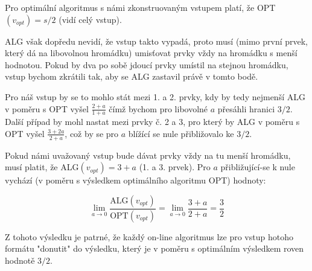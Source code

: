 \documentclass[a4paper, 12pt]{article}
\begin{document}
  Pro optimální algoritmus s námi zkonstruovaným vstupem platí, že OPT$(v_{opt})=s/2$ (vidí celý vstup).

  ALG však dopředu nevidí, že vstup takto vypadá, proto musí (mimo první prvek, který dá na libovolnou hromádku) umisťovat prvky vždy na hromádku s menší hodnotou. Pokud by dva po sobě jdoucí prvky umístil na stejnou hromádku, vstup bychom zkrátili tak, aby se ALG zastavil právě v tomto bodě.

  Pro náš vstup by se to mohlo stát mezi 1. a 2. prvky, kdy by tedy nejmenší ALG v poměru s OPT vyšel $\frac{2+a}{1+a}$ čímž bychom pro libovolné $a$ přesáhli hranici $3/2$. Další případ by mohl nastat mezi prvky č. 2 a 3, pro který by ALG v poměru s OPT vyšel $\frac{3+2a}{2+a}$, což by se pro $a$ blížící se nule přibližovalo ke $3/2$.

  Pokud námi uvažovaný vstup bude dávat prvky vždy na tu menší hromádku, musí platit, že ALG$(v_{opt})=3+a$ (1. a 3. prvek). Pro $a$ přibližující-se k nule vychází (v poměru s výsledkem optimálního algoritmu OPT) hodnoty:

  $$\lim_{a\to0} \frac{\text{ALG}(v_{opt})}{\text{OPT}(v_{opt})}
  =\lim_{a\to0} \frac{3+a}{2+a}
  =\frac{3}{2}$$

  Z tohoto výsledku je patrné, že každý on-line algoritmus lze pro vstup hotoho formátu "donutit" do výsledku, který je v poměru s optimálním výsledkem roven hodnotě $3/2$.
\end{document}
